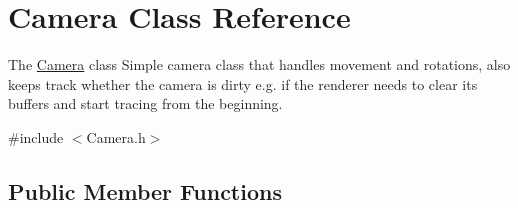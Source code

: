 \hypertarget{classCamera}{\section{Camera Class Reference}
\label{classCamera}
}


The \hyperlink{classCamera}{Camera} class Simple camera class that handles movement and rotations, also keeps track whether the camera is dirty e.\-g. if the renderer needs to clear its buffers and start tracing from the beginning.  




{\ttfamily \#include $<$Camera.\-h$>$}

\subsection*{Public Member Functions}
